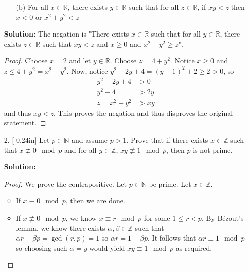 \documentclass[letterpaper,12pt]{article}
\theoremstyle{definition}
\begin{document}
\pagebreak
\begin{enumerate}
    \item[] \begin{enumerate}
        \item[(b)] For all $x \in \mathbb{R}$, there exists $y \in \mathbb{R}$ such that for all $z \in \mathbb{R}$, if $xy < z$ then $x < 0$ or $x^2 + y^2 < z$ 
    \end{enumerate}
    \begin{mdframed}
            \textbf{Solution:}
            The negation is "There exists $x \in \mathbb{R}$ such that for all $y \in \mathbb{R}$, there exists $z \in \mathbb{R}$ such that $xy < z$ and $x \geq 0$ and $x^2 + y^2 \geq z$".
            \renewcommand{\proofname}{Disproof} \begin{proof}
                Choose $x = 2$ and let $y \in \mathbb{R}$. Choose $z = 4 + y^2$. Notice $x \geq 0$ and $z \leq 4 + y^2 = x^2 + y^2$. Now, notice $y^2 - 2y + 4 = (y-1)^2 + 2 \geq 2 > 0$, so \begin{align*}
                    y^2 -2y + 4 &> 0 \\
                    y^2 + 4 &> 2y \\
                    z = x^2 + y^2 &> xy
                \end{align*}
                and thus $xy < z$. This proves the negation and thus disproves the original statement.
            \end{proof}
        \end{mdframed}
\end{enumerate}
\pagebreak
\begin{enumerate}
    \item[2.]  \reversemarginpar{}[-0.24in] Let $p \in \mathbb{N}$ and assume $p > 1$. Prove that if there exists $x \in \mathbb{Z}$ such that $x \not \equiv 0 \mod p$ and for all $y \in \mathbb{Z}$, $xy \not \equiv 1 \mod p$, then $p$ is not prime.
    \begin{mdframed}
        \textbf{Solution:} \begin{proof}
            We prove the contrapositive. Let $p \in \mathbb{N}$ be prime. Let $x \in \mathbb{Z}$. \begin{itemize}
                \item If $x \equiv 0 \mod p$, then we are done.
                \item If $x \not \equiv 0 \mod p$, we know $x \equiv r \mod p$ for some $1 \leq r < p$. By Bézout's lemma, we know there exists $\alpha,\beta \in \mathbb{Z}$ such that $\alpha r + \beta p = \gcd (r,p) = 1$ so $\alpha r = 1 - \beta p$. It follows that $\alpha r \equiv 1 \mod p$ so choosing such $\alpha = y$ would yield $xy \equiv 1 \mod p$ as required.
            \end{itemize}
        \end{proof}
    \end{mdframed}
\end{enumerate}
\end{document}
